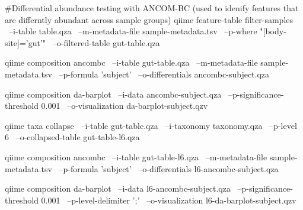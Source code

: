   #Differential abundance testing with ANCOM-BC (used to idenify features that are differntly abundant across sample groups)
  qiime feature-table filter-samples \
  --i-table table.qza \
  --m-metadata-file sample-metadata.tsv \
  --p-where "[body-site]='gut'" \
  --o-filtered-table gut-table.qza
  
  qiime composition ancombc \
  --i-table gut-table.qza \
  --m-metadata-file sample-metadata.tsv \
  --p-formula 'subject' \
  --o-differentials ancombc-subject.qza

qiime composition da-barplot \
  --i-data ancombc-subject.qza \
  --p-significance-threshold 0.001 \
  --o-visualization da-barplot-subject.qzv
  
  qiime taxa collapse \
  --i-table gut-table.qza \
  --i-taxonomy taxonomy.qza \
  --p-level 6 \
  --o-collapsed-table gut-table-l6.qza

qiime composition ancombc \
  --i-table gut-table-l6.qza \
  --m-metadata-file sample-metadata.tsv \
  --p-formula 'subject' \
  --o-differentials l6-ancombc-subject.qza

qiime composition da-barplot \
  --i-data l6-ancombc-subject.qza \
  --p-significance-threshold 0.001 \
  --p-level-delimiter ';' \
  --o-visualization l6-da-barplot-subject.qzv
  